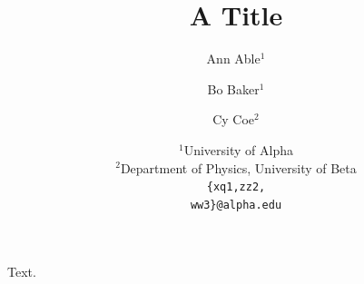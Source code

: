 \documentclass{article}
\title{A Title}
\author{%
  Ann Able$^{1}$ \\
  \and
  Bo Baker$^{1}$ \\
  \and
  Cy Coe$^{2}$ \\
  \and
 {\normalfont $^1$University of Alpha} \\
 {\normalfont $^2$Department of Physics, University of Beta} \\
\texttt{\{xq1,zz2,}\\ \texttt{ww3\}@alpha.edu}
}
\begin{document}
\maketitle
Text.
\end{document}
